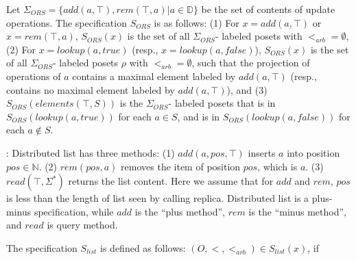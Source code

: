 Let $\Sigma_{\textit{ORS}} = \{ add(a,\top),rem(\top,a) \vert a \in \mathbb{D} \}$ be the set of contents of update operations. The specification $S_{\textit{ORS}}$ is as follows: (1) For $x=add(a,\top)$ or $x = rem(\top,a)$, $S_{\textit{ORS}}(x)$ is the set of all $\Sigma_{\textit{ORS}}$- labeled posets with $<_{\textit{arb}} = \emptyset$, (2) For $x=lookup(a,\textit{true})$ (resp., $x=lookup(a,\textit{false})$), $S_{\textit{ORS}}(x)$ is the set of all $\Sigma_{\textit{ORS}}$- labeled posets $\rho$ with $<_{\textit{arb}} = \emptyset$, such that the projection of operations of $a$ contains a maximal element labeled by $add(a,\top)$ (resp., contains no maximal element labeled by $add(a,\top)$), and (3) $S_{\textit{ORS}}(elements(\top,S))$ is the $\Sigma_{\textit{ORS}}$- labeled posets that is in $S_{\textit{ORS}}(lookup(a,\textit{true}))$ for each $a \in S$, and is in $S_{\textit{ORS}}(lookup(a,\textit{false}))$ for each $a \notin S$.

: Distributed list has three methods: (1) $add(a,pos,\top)$ inserts $a$ into position $pos \in \mathbb{N}$. (2) $rem(pos,a)$ removes the item of position $pos$, which is $a$. (3) $read(\top,\Sigma^*)$ returns the list content. Here we assume that for $add$ and $rem$, $pos$ is less than the length of list seen by calling replica. Distributed list is a plus-minus specification, while $add$ is the ``plus method'', $rem$ is the ``minus method'', and $read$ is query method.

The specification $S_{\textit{list}}$ is defined as follows: $(O,<,<_{\textit{arb}}) \in S_{\textit{list}}(x)$, if

